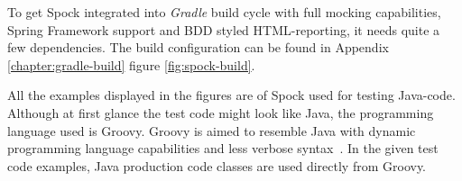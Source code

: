     To get Spock integrated into \textit{Gradle} build cycle with full mocking capabilities, Spring Framework support and BDD styled HTML-reporting, it needs
    quite a few dependencies. The build configuration can be found in Appendix \ref{chapter:gradle-build} figure \ref{fig:spock-build}.

    All the examples displayed in the figures are of Spock used for testing Java-code. Although at first glance the test code might
    look like Java, the programming language used is Groovy. Groovy is aimed to resemble Java with dynamic programming language
    capabilities and less verbose syntax~\cite{kapelonis2016java}. In the given test code examples, Java production code classes are used directly
    from Groovy.

